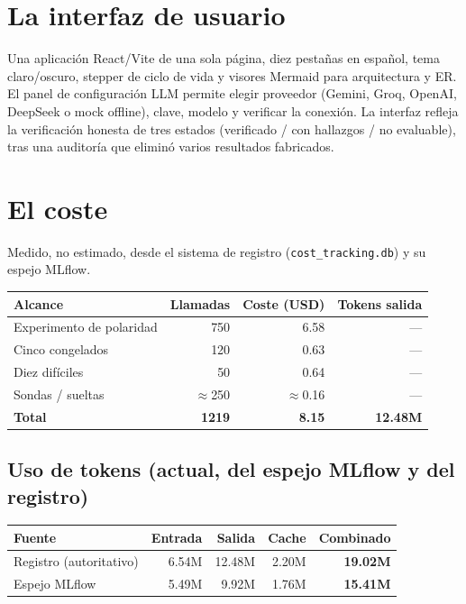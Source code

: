 \documentclass[11pt,a4paper]{article}
\begin{document}
\section{La interfaz de usuario}

Una aplicación React/Vite de una sola página, diez pestañas en español, tema
claro/oscuro, stepper de ciclo de vida y visores Mermaid para arquitectura y ER. El
panel de configuración LLM permite elegir proveedor (Gemini, Groq, OpenAI, DeepSeek o
mock offline), clave, modelo y verificar la conexión. La interfaz refleja la
verificación honesta de tres estados (verificado / con hallazgos / no evaluable), tras
una auditoría que eliminó varios resultados fabricados.

\section{El coste}

Medido, no estimado, desde el sistema de registro (\texttt{cost\_tracking.db}) y su
espejo MLflow.

\begin{center}
\begin{tabular}{@{}lrrr@{}}
\toprule
\textbf{Alcance} & \textbf{Llamadas} & \textbf{Coste (USD)} & \textbf{Tokens salida} \\
\midrule
Experimento de polaridad & 750 & 6.58 & --- \\
Cinco congelados & 120 & 0.63 & --- \\
Diez difíciles & 50 & 0.64 & --- \\
Sondas / sueltas & $\approx$250 & $\approx$0.16 & --- \\
\midrule
\textbf{Total} & \textbf{1219} & \textbf{8.15} & \textbf{12.48M} \\
\bottomrule
\end{tabular}
\end{center}

\subsection{Uso de tokens (actual, del espejo MLflow y del registro)}

\begin{center}
\begin{tabular}{@{}lrrrr@{}}
\toprule
\textbf{Fuente} & \textbf{Entrada} & \textbf{Salida} & \textbf{Cache} & \textbf{Combinado} \\
\midrule
Registro (autoritativo) & 6.54M & 12.48M & 2.20M & \textbf{19.02M} \\
Espejo MLflow & 5.49M & 9.92M & 1.76M & \textbf{15.41M} \\
\bottomrule
\end{tabular}
\end{center}
\end{document}
